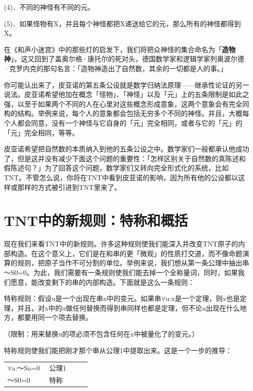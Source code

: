 \documentclass[
  12pt,
  twoside,
  openright,
  oldfontcommands,
]{memoir}
\newcommand{\heititext}[1]{{\heifamily\bfseries #1}}
\begin{document}
(4)．不同的神怪有不同的元。

(5)．如果怪物有X，并且每个神怪都把X递送给它的元，那么所有的神怪都得到X。

在《和声小迷宫》中的那些灯的启发下，我们将把众神怪的集合命名为「\heititext{造物神}」。这又回到了盖奥尔格·康托尔的死对头，德国数学家和逻辑学家列奥波尔德·克罗内克的那句名言：「造物神造出了自然数，其余的一切都是人的事。」

你可能认出来了，皮亚诺的第五条公设就是数学归纳法原理------继承性论证的另一说法。皮亚诺希望他加在概念「怪物」、「神怪」以及「元」上的五条限制是如此之强，以至于如果两个不同的人在心里对这些概念形成意象，这两个意象会有完全同构的结构。举例来说，每个人的意象都会包括无穷多个不同的神怪。并且，大概每个人都会同意，没有一个神怪与它自身的「元」完全相同，或者与它的「元」的「元」完全相同，等等。

皮亚诺希望把自然数的本质纳入到他的五条公设之中。数学家们一般都承认他成功了，但是这并没有减少下面这个问题的重要性：「怎样区别关于自然数的真陈述和假陈述句？」为了回答这个问题，数学家们又转向完全形式化的系统，比如TNT。不管怎么说，你将在TNT中看到皮亚诺的影响，因为所有他的公设都以这样或那样的方式被引进到TNT里来了。

\section{TNT中的新规则：特称和概括}

现在我们来看TNT中的新规则。许多这种规则使我们能深入并改变TNT原子的内部构造。在这个意义上，它们是在和串的更「微观」的性质打交道，而不像命题演算的规则，把原子当作不可分割的单位。举例来说，我们想从第一条公理中抽出串～S0=0。为此，我们需要有一条规则使我们能去掉一个全称量词，同时，如果我们愿意，能改变剩下的串的内部构造。下面就是这么一条规则：

特称规则：假设u是一个出现在串x中的变元。如果串$\forall$u:x是一个定理，则x也是定理，并且，对x中的u做任何替换而得到串同样也都是定理，但不论u出现在什么地方，都要用同一个项去替换。

（限制：用来替换u的项必须不包含任何在x中被量化了的变元。）

特称规则使我们能把刚才那个串从公理1中提取出来。这是一个一步的推导：

\begin{longtable}[]{>{\raggedright\arraybackslash}p{0.47\linewidth} >{\raggedright\arraybackslash}p{0.47\linewidth}}
\toprule\noalign{}
\endhead
\bottomrule\noalign{}
\endlastfoot
$\forall$a:～Sa=0 & 公理1 \\
～S0=0 & 特称 \\
\end{longtable}
\end{document}

